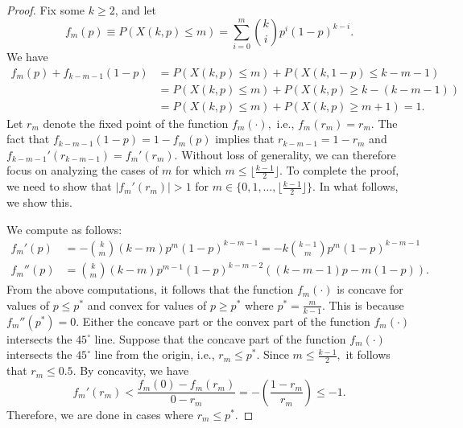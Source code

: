 \documentclass[12pt]{article}
\numberwithin{equation}{section}
\numberwithin{figure}{section}
\theoremstyle{definition}
\theoremstyle{plain}
\theoremstyle{plain}
\theoremstyle{plain}
\theoremstyle{remark}
\theoremstyle{plain}
\theoremstyle{plain}
\begin{document}
\begin{proof}

Fix some 
$k\geq 2$, and let 
\begin{equation}\label{eq:wkmp}
f_m(p)\equiv P(X(k,p) \leq m)=\sum_{i=0}^{m}\binom{k}{i}p^i(1-p)^{k-i}.
\end{equation}
We have
\begin{align*}
    f_m(p) + f_{k-m-1}(1-p) &= P(X(k,p)\leq m) + P(X(k,1-p)\leq k-m-1)\\
    &= P(X(k,p)\leq m) + P(X(k,p)\geq k- (k-m-1))\\
    &= P(X(k,p)\leq m) + P(X(k,p)\geq m+1) = 1.
\end{align*}
Let $r_m$ denote the fixed point of the function $f_m(\cdot),$ i.e., $f_m(r_m) =r_m.$ The fact that $f_{k-m-1}(1-p) = 1 - f_m(p)$ implies that $r_{k-m-1} = 1-r_m$ and $f_{k-m-1}'(r_{k-m-1}) = f_m'(r_m).$ Without loss of generality, we can therefore focus on analyzing the cases of $m$ for which $m \leq \lfloor\frac{k-1}{2}\rfloor.$ To complete the proof, we need to show that $|f_m'(r_m)| >1$ for $m \in \{0,1,\dots, \lfloor\frac{k-1}{2}\rfloor\}.$ In what follows, we show this.

We compute as follows:
\begin{align}\label{eq:wkmprime}
    f_{m}'(p) &= -\binom{k}{m}(k-m)p^m(1-p)^{k-m-1} = -k\binom{k-1}{m}p^m(1-p)^{k-m-1}\\
    f_{m}''(p) &= \binom{k}{m}(k-m)p^{m-1}(1-p)^{k-m-2}((k-m-1)p-m(1-p)).\nonumber
\end{align}
From the above computations, it follows that the function $f_m(\cdot)$ is concave for values of $p \leq p^{\ast}$ and convex for values of $p \geq p^{\ast}$ where $p^{\ast} = \frac{m}{k-1}.$ This is because $f_m''(p^{\ast}) = 0.$ Either the concave part or the convex part of the function $f_m(\cdot)$ intersects the $45^{\circ}$ line. Suppose that the concave part of the function $f_m(\cdot)$ intersects the $45^{\circ}$ line from the origin, i.e., $r_m \leq p^{\ast}.$ Since $m \leq \frac{k-1}{2},$ it follows that $r_m \leq 0.5.$ By concavity, we have
\[
f_m'(r_m)<\frac{f_m(0)-f_m(r_m)}{0-r_m}=-\left(\frac{1-r_m}{r_m}\right)\leq -1.\]
Therefore, we are done in cases where $r_m \leq p^{\ast}.$


\end{proof}
\end{document}
